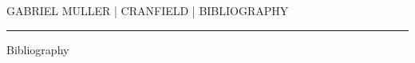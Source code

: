 \documentclass[paper=a4, fontsize=11pt]{scrartcl}
\begin{document}
\begin{center}
\MakeUppercase{Gabriel Muller | Cranfield | Bibliography} 
\end{center}

\rule{\linewidth}{1pt}
\begin{center}
\huge{Bibliography}
\end{center}


\citep{Reference1}
\citep{Reference2}


\end{document}
